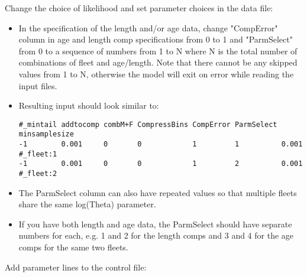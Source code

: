 
Change the choice of likelihood and set parameter choices in the data file:

\begin{itemize}
	\item In the specification of the length and/or age data, change "CompError" column in age and length comp specifications from 0 to 1 and "ParmSelect" from 0 to a sequence of numbers from 1 to N where N is the total number of combinations of fleet and age/length. Note that there cannot be any skipped values from 1 to N, otherwise the model will exit on error while reading the input files.
	
	\item Resulting input should look similar to:
\begin{small}
\begin{verbatim}
#_mintail addtocomp combM+F CompressBins CompError ParmSelect minsamplesize   
-1        0.001     0       0            1         1          0.001 #_fleet:1
-1        0.001     0       0            1         2          0.001 #_fleet:2
\end{verbatim}
\end{small}

	\item The ParmSelect column can also have repeated values so that multiple fleets share the same log(Theta) parameter.
	
	\item If you have both length and age data, the ParmSelect should have separate numbers for each, e.g. 1 and 2 for the length comps and 3 and 4 for the age comps for the same two fleets.
	
\end{itemize}

Add parameter lines to the control file:

